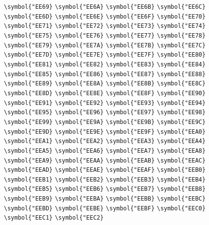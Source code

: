 \documentclass{ctexbook}
\begin{document}
{\verb|\symbol{"EE69}|  \verb|\symbol{"EE6A}|  \verb|\symbol{"EE6B}|  \verb|\symbol{"EE6C}|  \verb|\symbol{"EE6D}|  \verb|\symbol{"EE6E}|  \verb|\symbol{"EE6F}|  \verb|\symbol{"EE70}|  \verb|\symbol{"EE71}|  \verb|\symbol{"EE72}|  \verb|\symbol{"EE73}|  \verb|\symbol{"EE74}|  \verb|\symbol{"EE75}|  \verb|\symbol{"EE76}|  \verb|\symbol{"EE77}|  \verb|\symbol{"EE78}|  \verb|\symbol{"EE79}|  \verb|\symbol{"EE7A}|  \verb|\symbol{"EE7B}|  \verb|\symbol{"EE7C}|  \verb|\symbol{"EE7D}|  \verb|\symbol{"EE7E}|  \verb|\symbol{"EE7F}|  \verb|\symbol{"EE80}|  \verb|\symbol{"EE81}|  \verb|\symbol{"EE82}|  \verb|\symbol{"EE83}|  \verb|\symbol{"EE84}|  \verb|\symbol{"EE85}|  \verb|\symbol{"EE86}|  \verb|\symbol{"EE87}|  \verb|\symbol{"EE88}|  \verb|\symbol{"EE89}|  \verb|\symbol{"EE8A}|  \verb|\symbol{"EE8B}|  \verb|\symbol{"EE8C}|  \verb|\symbol{"EE8D}|  \verb|\symbol{"EE8E}|  \verb|\symbol{"EE8F}|  \verb|\symbol{"EE90}|  \verb|\symbol{"EE91}|  \verb|\symbol{"EE92}|  \verb|\symbol{"EE93}|  \verb|\symbol{"EE94}|  \verb|\symbol{"EE95}|  \verb|\symbol{"EE96}|  \verb|\symbol{"EE97}|  \verb|\symbol{"EE98}|  \verb|\symbol{"EE99}|  \verb|\symbol{"EE9A}|  \verb|\symbol{"EE9B}|  \verb|\symbol{"EE9C}|  \verb|\symbol{"EE9D}|  \verb|\symbol{"EE9E}|  \verb|\symbol{"EE9F}|  \verb|\symbol{"EEA0}|  \verb|\symbol{"EEA1}|  \verb|\symbol{"EEA2}|  \verb|\symbol{"EEA3}|  \verb|\symbol{"EEA4}|  \verb|\symbol{"EEA5}|  \verb|\symbol{"EEA6}|  \verb|\symbol{"EEA7}|  \verb|\symbol{"EEA8}|  \verb|\symbol{"EEA9}|  \verb|\symbol{"EEAA}|  \verb|\symbol{"EEAB}|  \verb|\symbol{"EEAC}|  \verb|\symbol{"EEAD}|  \verb|\symbol{"EEAE}|  \verb|\symbol{"EEAF}|  \verb|\symbol{"EEB0}|  \verb|\symbol{"EEB1}|  \verb|\symbol{"EEB2}|  \verb|\symbol{"EEB3}|  \verb|\symbol{"EEB4}|  \verb|\symbol{"EEB5}|  \verb|\symbol{"EEB6}|  \verb|\symbol{"EEB7}|  \verb|\symbol{"EEB8}|  \verb|\symbol{"EEB9}|  \verb|\symbol{"EEBA}|  \verb|\symbol{"EEBB}|  \verb|\symbol{"EEBC}|  \verb|\symbol{"EEBD}|  \verb|\symbol{"EEBE}|  \verb|\symbol{"EEBF}|  \verb|\symbol{"EEC0}|  \verb|\symbol{"EEC1}|  \verb|\symbol{"EEC2}|  }
\end{document}
